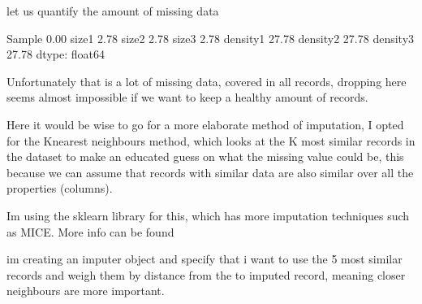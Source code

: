 \documentclass[letterpaper,10pt,english]{jupyterBook}
\begin{document}
\sphinxAtStartPar
let us quantify the amount of missing data

\begin{sphinxVerbatim}[commandchars=\\\{\}]
\end{sphinxVerbatim}

\begin{sphinxVerbatim}[commandchars=\\\{\}]
Sample       0.00
size1        2.78
size2        2.78
size3        2.78
density1    27.78
density2    27.78
density3    27.78
dtype: float64
\end{sphinxVerbatim}

\sphinxAtStartPar
Unfortunately that is a lot of missing data, covered in all records, dropping here seems almost impossible if we want to keep a healthy amount of records.

\sphinxAtStartPar
Here it would be wise to go for a more elaborate method of imputation, I opted for the K\sphinxhyphen{}nearest neighbours method, which looks at the K most similar records in the dataset to make an educated guess on what the missing value could be, this because we can assume that records with similar data are also similar over all the properties (columns).

\sphinxAtStartPar
Im using the sklearn library for this, which has more imputation techniques such as MICE.
More info can be found 

\begin{sphinxVerbatim}[commandchars=\\\{\}]
   
\end{sphinxVerbatim}

\sphinxAtStartPar
im creating an imputer object and specify that i want to use the 5 most similar records and weigh them by distance from the to imputed record, meaning closer neighbours are more important.

\begin{sphinxVerbatim}[commandchars=\\\{\}]
   
\end{sphinxVerbatim}
\end{document}
